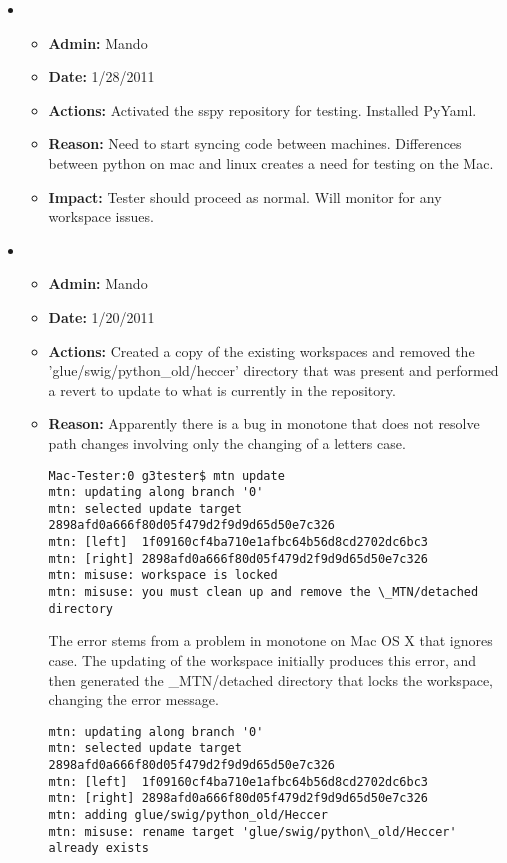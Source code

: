 \documentclass[12pt]{article}
\begin{document}
\begin{itemize}
\item
\begin{itemize}
\item[] {\bf Admin:} Mando
\item[] {\bf Date:} 1/28/2011 
\item[] {\bf Actions:}  Activated the sspy repository for testing. Installed PyYaml.
\item[] {\bf Reason:} Need to start syncing code between machines. Differences between python on mac and linux creates a need for testing on the Mac. 
\item[] {\bf Impact:}  Tester should proceed as normal. Will monitor for any workspace issues.
\end{itemize}

\item 
\begin{itemize}
\item[] {\bf Admin:} Mando
\item[] {\bf Date:} 1/20/2011
\item[] {\bf Actions:} Created a copy of the existing workspaces and removed the 'glue/swig/python\_old/heccer' directory that was present and performed a revert to update to what is currently in the repository.
\item[] {\bf Reason:}  Apparently there is a bug in monotone that does not resolve path changes involving only the changing of a letters case.

\begin{verbatim}
Mac-Tester:0 g3tester$ mtn update
mtn: updating along branch '0'
mtn: selected update target 2898afd0a666f80d05f479d2f9d9d65d50e7c326
mtn: [left]  1f09160cf4ba710e1afbc64b56d8cd2702dc6bc3
mtn: [right] 2898afd0a666f80d05f479d2f9d9d65d50e7c326
mtn: misuse: workspace is locked
mtn: misuse: you must clean up and remove the \_MTN/detached directory
\end{verbatim}

The error stems from a problem in monotone on Mac OS X that ignores case.  The updating of the workspace initially produces this error, and then generated the \_MTN/detached directory that locks the workspace, changing the error message.

\begin{verbatim}
mtn: updating along branch '0'
mtn: selected update target 2898afd0a666f80d05f479d2f9d9d65d50e7c326
mtn: [left]  1f09160cf4ba710e1afbc64b56d8cd2702dc6bc3
mtn: [right] 2898afd0a666f80d05f479d2f9d9d65d50e7c326
mtn: adding glue/swig/python_old/Heccer
mtn: misuse: rename target 'glue/swig/python\_old/Heccer' already exists
\end{verbatim}


\end{itemize}
\end{itemize}
\end{document}

